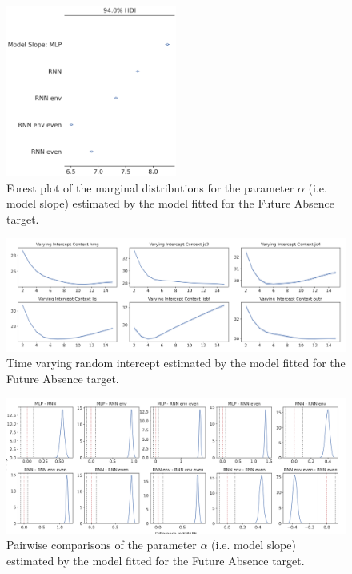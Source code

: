 \begin{figure}[ht]
\centering
\includegraphics[width=0.5\textwidth]{images/appendix_C/collapsed_models_3.png}
\caption[\textbf{Targets collapsed model fixed effect}]{Forest plot of the marginal distributions for the parameter $\alpha$ (i.e. model slope) estimated by the model fitted for the Future Absence target.}
\label{model_coll_3}
\end{figure} \FloatBarrier

\begin{figure}[ht]
\centering
\includegraphics[width=\textwidth]{images/appendix_C/collapsed_interc_3.png}
\caption[\textbf{Targets collapsed time-varying random intercept}]{Time varying random intercept estimated by the model fitted for the Future Absence target.}
\label{interc_coll_3}
\end{figure} \FloatBarrier

\begin{figure}[ht]
\centering
\includegraphics[width=\textwidth]{images/appendix_C/collapsed_comp_3.png}
\caption[\textbf{Targets collapsed pairwise comparisons of model fixed effect}]{Pairwise comparisons of the parameter $\alpha$ (i.e. model slope) estimated by the model fitted for the Future Absence target.}
\label{comp_coll_3}
\end{figure} \FloatBarrier

